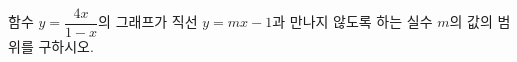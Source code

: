\hspace*{2mm}\begin{minipage}[t]{\dimexpr\linewidth-2mm\relax}\vspace{0pt}
함수 $y=\dfrac{4x}{1-x}$의 그래프가 직선 $y=mx-1$과 만나지 않도록 하는 실수 $m$의 값의 범위를 구하시오.\end{minipage}
